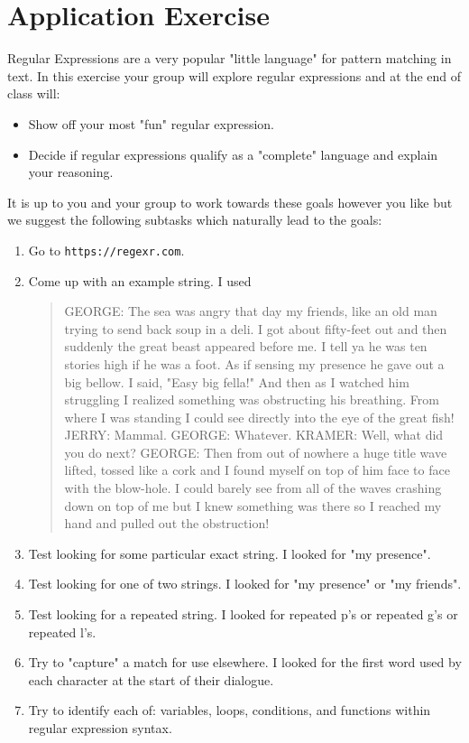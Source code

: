 \documentclass[twoside=false, DIV=14]{scrartcl}
\begin{document}
\newpage
\part*{Application Exercise}
Regular Expressions are a very popular "little language" for pattern matching in text.  In this exercise your group will explore regular expressions and at the end of class will:
\begin{itemize}
  \item Show off your most "fun" regular expression.
  \item Decide if regular expressions qualify as a "complete" language and explain your reasoning.
\end{itemize}
It is up to you and your group to work towards these goals however you like but we suggest the following subtasks which naturally lead to the goals:
\begin{enumerate}
  \item Go to \verb+https://regexr.com+.
  \item Come up with an example string.  I used {\tiny \begin{quote} GEORGE: The sea was angry that day my friends, like an old man trying to send back soup in a deli. I got about fifty-feet out and then suddenly the great beast appeared before me. I tell ya he was ten stories high if he was a foot. As if sensing my presence he gave out a big bellow. I said, "Easy big fella!" And then as I watched him struggling I realized something was obstructing his breathing. From where I was standing I could see directly into the eye of the great fish! JERRY: Mammal. GEORGE: Whatever. KRAMER: Well, what did you do next? GEORGE: Then from out of nowhere a huge title wave lifted, tossed like a cork and I found myself on top of him face to face with the blow-hole. I could barely see from all of the waves crashing down on top of me but I knew something was there so I reached my hand and pulled out the obstruction!\end{quote}}
  \item Test looking for some particular exact string.  I looked for "my presence".
  \item Test looking for one of two strings. I looked for "my presence" or "my friends".
  \item Test looking for a repeated string.  I looked for repeated p's or repeated g's or repeated l's.
  \item Try to "capture" a match for use elsewhere.  I looked for the first word used by each character at the start of their dialogue.
  \item Try to identify each of: variables, loops, conditions, and functions within regular expression syntax.
\end{enumerate}
\end{document}
